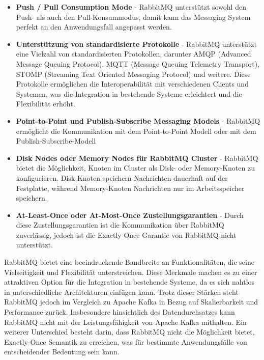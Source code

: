 \begin{itemize}
	\item \textbf{Push / Pull Consumption Mode} - RabbitMQ unterstützt sowohl den Push- als auch den Pull-Konsummodus, damit kann das Messaging System perfekt an den Anwendungsfall angepasst werden.
	\item \textbf{Unterstützung von standardisierte Protokolle} - RabbitMQ unterstützt eine Vielzahl von standardisierten Protokollen, darunter AMQP (Advanced Message Queuing Protocol), MQTT (Message Queuing Telemetry Transport), STOMP (Streaming Text Oriented Messaging Protocol) und weitere. Diese Protokolle ermöglichen die Interoperabilität mit verschiedenen Clients und Systemen, was die Integration in bestehende Systeme erleichtert und die Flexibilität erhöht.
	\item \textbf{Point-to-Point und Publish-Subscribe Messaging Models} - RabbitMQ ermöglicht die Kommunikation mit dem Point-to-Point Modell oder mit dem Publish-Subscribe-Modell
	\item \textbf{Disk Nodes oder Memory Nodes für RabbitMQ Cluster} - RabbitMQ bietet die Möglichkeit, Knoten im Cluster als Disk- oder Memory-Knoten zu konfigurieren. Disk-Knoten speichern Nachrichten dauerhaft auf der Festplatte, während Memory-Knoten Nachrichten nur im Arbeitsspeicher speichern.
	\item \textbf{At-Least-Once oder At-Most-Once Zustellungsgarantien} - Durch diese Zustellungsgarantien ist die Kommunikation über RabbitMQ zuverlässig, jedoch ist die Exactly-Once Garantie von RabbitMQ nicht unterstützt. 
\end{itemize}

RabbitMQ bietet eine beeindruckende Bandbreite an Funktionalitäten, die seine Vielseitigkeit und Flexibilität unterstreichen. Diese Merkmale machen es zu einer attraktiven Option für die Integration in bestehende Systeme, da es sich nahtlos in unterschiedliche Architekturen einfügen kann. Trotz dieser Stärken steht RabbitMQ jedoch im Vergleich zu Apache Kafka in Bezug auf Skalierbarkeit und Performance zurück. Insbesondere hinsichtlich des Datendurchsatzes kann RabbitMQ nicht mit der Leistungsfähigkeit von Apache Kafka mithalten. Ein weiterer Unterschied besteht darin, dass RabbitMQ nicht die Möglichkeit bietet, Exactly-Once Semantik zu erreichen, was für bestimmte Anwendungsfälle von entscheidender Bedeutung sein kann.
\cite{toshevLearningRabbitMQBuild2016,fuFairComparisonMessage2021}

